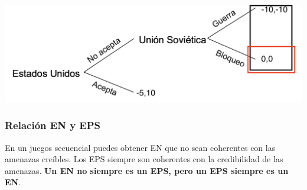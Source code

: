 \begin{center}
    \includegraphics[scale = 0.50]{Figuras/Inducción.png}
\end{center}

\subsubsection*{Relación EN y EPS}

En un juegos secuencial puedes obtener EN que no sean coherentes con las amenazas creíbles. Los EPS siempre son coherentes con la credibilidad de las amenazas. \textbf{Un EN no siempre es un EPS, pero un EPS siempre es un EN}. 
